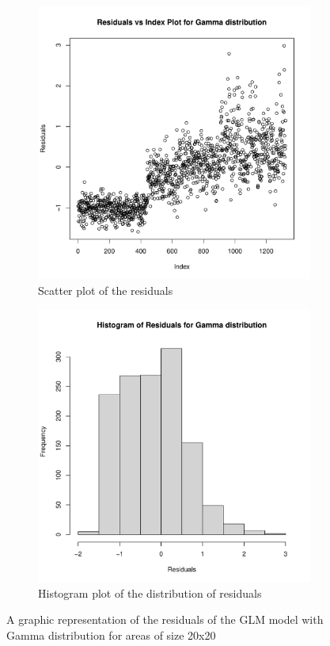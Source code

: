 \documentclass[12pt,a4paper,twoside]{article}
\begin{document}
\begin{figure}[!ht]
    \begin{subfigure}{.45\textwidth}
        \centering
        \includegraphics[width=\linewidth]{img/Gamma_distribution_20x20.pdf}
        \caption{Scatter plot of the residuals}
        \label{fig:gammascatter20}
    \end{subfigure}
    \begin{subfigure}{.45\textwidth}
        \centering
        \includegraphics[width=\linewidth]{img/Gamma_distribution_histogram_20x20.pdf}
        \caption{Histogram plot of the distribution of residuals}
        \label{fig:gammahist20}
    \end{subfigure}
    \caption{A graphic representation of the residuals of the GLM model with Gamma
        distribution for areas of size 20x20}
    \label{fig:gammafig20}
\end{figure}
\end{document}
